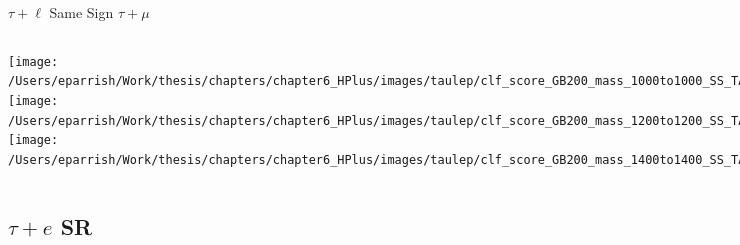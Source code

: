 \documentclass[aspectratio=169,xcolor=table]{beamer}
\begin{document}
    \begin{frame}[t]{$\tau+\ell$ Same Sign $\tau+\mu$}
      \begin{columns}[t]
          \texttt{[image: /Users/eparrish/Work/thesis/chapters/chapter6\_HPlus/images/taulep/clf\_score\_GB200\_mass\_1000to1000\_SS\_TAUMU.png]}
          \texttt{[image: /Users/eparrish/Work/thesis/chapters/chapter6\_HPlus/images/taulep/clf\_score\_GB200\_mass\_1200to1200\_SS\_TAUMU.png]}
          \texttt{[image: /Users/eparrish/Work/thesis/chapters/chapter6\_HPlus/images/taulep/clf\_score\_GB200\_mass\_1400to1400\_SS\_TAUMU.png]}

          \texttt{[image: /Users/eparrish/Work/thesis/chapters/chapter6\_HPlus/images/taulep/clf\_score\_GB200\_mass\_1600to1600\_SS\_TAUMU.png]}
          \texttt{[image: /Users/eparrish/Work/thesis/chapters/chapter6\_HPlus/images/taulep/clf\_score\_GB200\_mass\_1800to1800\_SS\_TAUMU.png]}
          \texttt{[image: /Users/eparrish/Work/thesis/chapters/chapter6\_HPlus/images/taulep/clf\_score\_GB200\_mass\_2000to2000\_SS\_TAUMU.png]}

          \texttt{[image: /Users/eparrish/Work/thesis/chapters/chapter6\_HPlus/images/taulep/clf\_score\_GB200\_mass\_2500to2500\_SS\_TAUMU.png]}
          \texttt{[image: /Users/eparrish/Work/thesis/chapters/chapter6\_HPlus/images/taulep/clf\_score\_GB200\_mass\_3000to3000\_SS\_TAUMU.png]}


      \end{columns}
    \end{frame}

  \subsection{$\tau+e$ SR}
\end{document}
